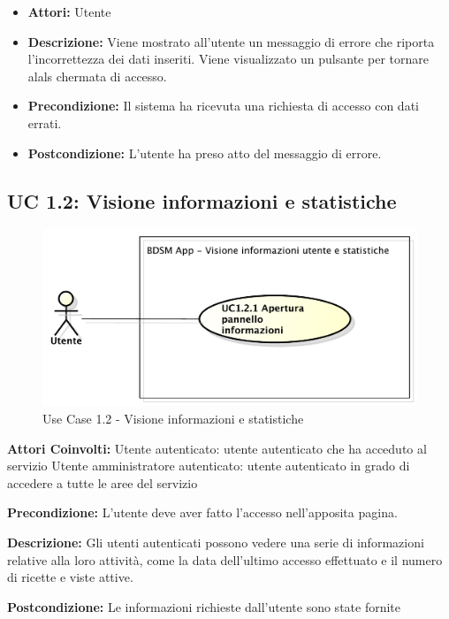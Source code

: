 \begin{itemize}
    \item \textbf{Attori:} Utente
    \item \textbf{Descrizione:} Viene mostrato all'utente un messaggio di errore che riporta l'incorrettezza dei dati inseriti. Viene visualizzato un pulsante per tornare alals chermata di accesso.
    \item \textbf{Precondizione:} Il sistema ha ricevuta una richiesta di accesso con dati errati.
    \item \textbf{Postcondizione:} L'utente ha preso atto del messaggio di errore.
\end{itemize}

\subsection{UC 1.2: Visione informazioni e statistiche}

\begin{figure}[htbp]
    \centering
    \centerline{\includegraphics[scale=0.6]{./images/UC1_2.pdf}}
    \caption{Use Case 1.2 - Visione informazioni e statistiche}
\end{figure}

	\textbf{Attori Coinvolti:}
Utente autenticato: utente autenticato che ha acceduto al servizio
Utente amministratore autenticato: utente autenticato in grado di accedere a tutte le aree del servizio

	\textbf{Precondizione:}
L'utente deve aver fatto l'accesso nell'apposita pagina.

	\textbf{Descrizione:}
Gli utenti autenticati possono vedere una serie di informazioni relative alla loro attività, come la data dell’ultimo accesso effettuato e il numero di ricette e viste attive.

	\textbf{Postcondizione:}
Le informazioni richieste dall'utente sono state fornite

